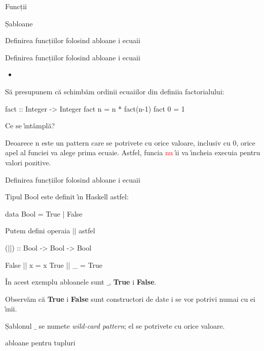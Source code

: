 \documentclass[xcolor=pdftex,romanian,colorlinks]{beamer}
\begin{document}
\begin{section}{Funcții}
\begin{subsection}{Șabloane}
\begin{frame}[fragile]{Definirea funcțiilor folosind \sh abloane \sh i ecua\ts ii}
\end{frame}


\begin{frame}[fragile]{Definirea funcțiilor folosind \sh abloane \sh i ecua\ts ii}


\begin{itemize}
\item {}
\end{itemize}


S\u a presupunem c\u a schimb\u am   ordinii ecua\ts iilor din defini\ts ia factorialului:

\begin{asciihs}
fact :: Integer -> Integer
fact n = n * fact(n-1)
fact 0 = 1
\end{asciihs}

Ce se \^{\i}nt\^{a}mpl\u a?
\medskip\pause

Deoarece n este un pattern care se potrive\sh te cu orice valoare, inclusiv cu $0$,  orice apel al func\ts iei va alege prima ecua\ts ie.  Astfel, func\ts ia \textcolor{red}{nu} \^{\i}\sh i va \^{\i}ncheia execu\ts ia pentru valori pozitive.
\end{frame}

\begin{frame}[fragile]{Definirea funcțiilor folosind \sh abloane \sh i ecua\ts ii}

Tipul Bool este definit \^{\i}n Haskell astfel:
\begin{asciihs}
data Bool = True | False
\end{asciihs}

Putem defini opera\ts ia $||$ astfel

\begin{asciihs}
(||) :: Bool -> Bool -> Bool

False || x = x
True  || _ = True
\end{asciihs}


\^{I}n acest exemplu \sh abloanele sunt {\bf $\_$}, {\bf True} \sh i {\bf False}.
\medskip

Observ\u am c\u a {\bf True} \sh i {\bf False} sunt constructori de date \sh i se vor potrivi numai cu ei \^{\i}n\sh i\sh i.
\medskip

 Șablonul {\bf $\_$} se nume\sh te {\it wild-card pattern}; el se potrive\sh te cu orice valoare.


\end{frame}


\begin{frame}[fragile]{\Sh abloane pentru tupluri}


\end{frame}
\end{subsection}
\end{section}
\end{document}
